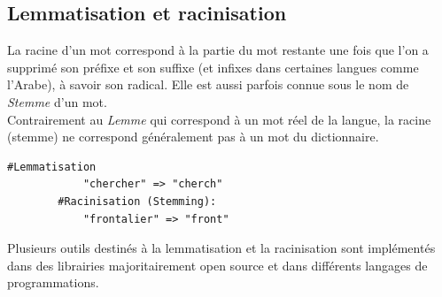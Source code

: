     \subsection{Lemmatisation et racinisation}
    La racine d'un mot correspond à la partie du mot restante une fois que l'on a supprimé son préfixe et son suffixe (et infixes dans certaines langues comme l'Arabe), à savoir son radical. Elle est aussi parfois connue sous le nom de \emph{Stemme} d'un mot.\\ 
    Contrairement au \emph{Lemme} qui correspond à un mot réel de la langue, la racine (stemme) ne correspond généralement pas à un mot du dictionnaire.
    \begin{lstlisting}[style=code]
        #Lemmatisation 
            "chercher" => "cherch"
        #Racinisation (Stemming):
            "frontalier" => "front"  
    \end{lstlisting}
    Plusieurs outils destinés à la lemmatisation et la racinisation sont implémentés dans des librairies majoritairement open source et dans différents langages de programmations.

